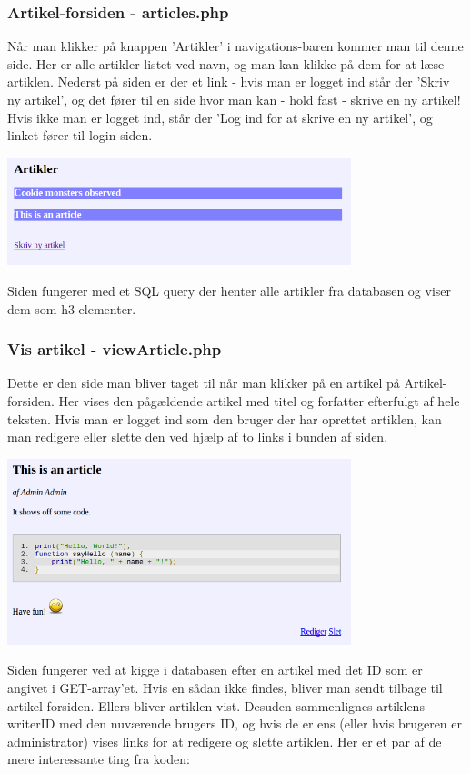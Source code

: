\documentclass{article}
\begin{document}
\subsubsection[Artikel-forsiden]{Artikel-forsiden - articles.php}
Når man klikker på knappen 'Artikler' i navigations-baren kommer man til denne side. Her er alle artikler listet ved navn, og man kan klikke på dem for at læse artiklen. Nederst på siden er der et link - hvis man er logget ind står der 'Skriv ny artikel', og det fører til en side hvor man kan - hold fast - skrive en ny artikel! Hvis ikke man er logget ind, står der 'Log ind for at skrive en ny artikel', og linket fører til login-siden.

\includegraphics[width=100mm]{mi05.png}

Siden fungerer med et SQL query der henter alle artikler fra databasen og viser dem som h3 elementer.



\subsubsection[Vis artikel]{Vis artikel - viewArticle.php}
Dette er den side man bliver taget til når man klikker på en artikel på Artikel-forsiden. Her vises den pågældende artikel med titel og forfatter efterfulgt af hele teksten. Hvis man er logget ind som den bruger der har oprettet artiklen, kan man redigere eller slette den ved hjælp af to links i bunden af siden.

\includegraphics[width=100mm]{mi10.png}

Siden fungerer ved at kigge i databasen efter en artikel med det ID som er angivet i GET-array'et. Hvis en sådan ikke findes, bliver man sendt tilbage til artikel-forsiden. Ellers bliver artiklen vist. Desuden sammenlignes artiklens writerID med den nuværende brugers ID, og hvis de er ens (eller hvis brugeren er administrator) vises links for at redigere og slette artiklen. Her er et par af de mere interessante ting fra koden:
\end{document}
